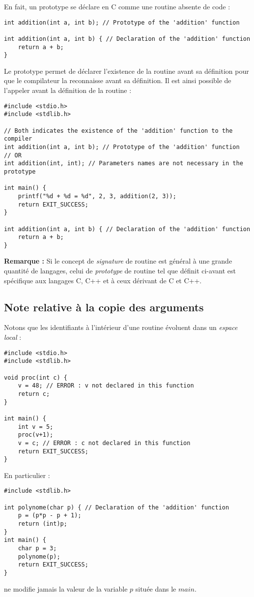 \documentclass[../../../main.tex]{subfiles}
\begin{document}
En fait, un prototype se déclare en C comme une routine absente de code :
\begin{verbatim}
int addition(int a, int b); // Prototype of the 'addition' function

int addition(int a, int b) { // Declaration of the 'addition' function
	return a + b;
}
\end{verbatim}
Le prototype permet de déclarer l'existence de la routine avant sa définition pour que le compilateur la reconnaisse avant sa définition. Il est ainsi possible de l'appeler avant la définition de la routine :
\begin{verbatim}
#include <stdio.h>
#include <stdlib.h>

// Both indicates the existence of the 'addition' function to the compiler
int addition(int a, int b); // Prototype of the 'addition' function
// OR
int addition(int, int); // Parameters names are not necessary in the prototype

int main() {
	printf("%d + %d = %d", 2, 3, addition(2, 3));
	return EXIT_SUCCESS;
}

int addition(int a, int b) { // Declaration of the 'addition' function
	return a + b;
}
\end{verbatim}
 
\textbf{Remarque :} Si le concept de \textit{signature} de routine est général à une grande quantité de langages, celui de \textit{prototype} de routine tel que définit ci-avant est spécifique aux langages C, C++ et à ceux dérivant de C et C++.
\subsection{Note relative à la copie des arguments}
Notons que les identifiants à l'intérieur d'une routine évoluent dans un \textit{espace local} :
\begin{verbatim}
#include <stdio.h>
#include <stdlib.h>

void proc(int c) {
	v = 48; // ERROR : v not declared in this function
	return c;
}

int main() {
	int v = 5;
	proc(v+1);
	v = c; // ERROR : c not declared in this function
	return EXIT_SUCCESS;
}
\end{verbatim}
En particulier :
\begin{verbatim}
#include <stdlib.h>

int polynome(char p) { // Declaration of the 'addition' function
	p = (p*p - p + 1);
	return (int)p;
}
int main() {
	char p = 3;
	polynome(p);
	return EXIT_SUCCESS;
}
\end{verbatim}
ne modifie jamais la valeur de la variable $p$ située dans le $main$.
 
\end{document}
